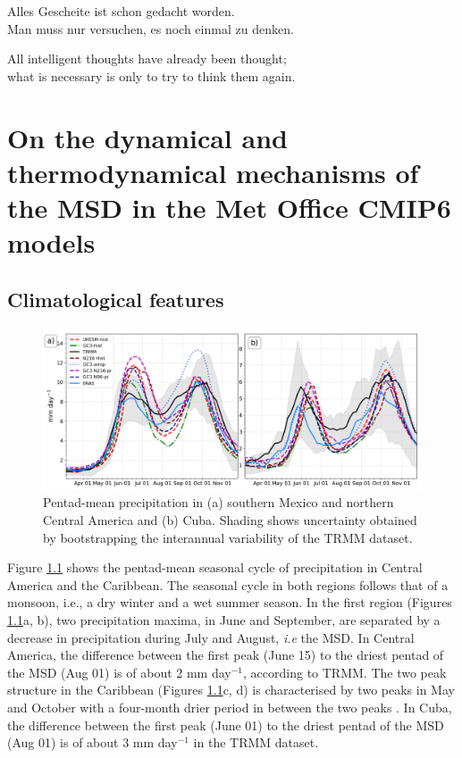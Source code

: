 \begin{savequote}[8cm]
Alles Gescheite ist schon gedacht worden.\\
Man muss nur versuchen, es noch einmal zu denken.

All intelligent thoughts have already been thought;\\
what is necessary is only to try to think them again.
\end{savequote}

\chapter{\label{ch:2-litreview}On the dynamical and thermodynamical mechanisms of the MSD in the Met Office CMIP6 models}

\minitoc


\section{Climatological features}
\label{sq:msdclim}
 \begin{figure}[t!]
\includegraphics[width=\linewidth]{figures/pmean_f2.png}
\caption{Pentad-mean precipitation in (a) southern Mexico and northern Central America and (b) Cuba. Shading shows uncertainty obtained by bootstrapping the interannual variability of the TRMM dataset. }
\label{fig:msdcaribb}
\end{figure}

Figure \ref{fig:msdcaribb} shows the pentad-mean seasonal cycle of precipitation in Central America and the Caribbean. The seasonal cycle in both regions follows that of a monsoon, i.e., a dry winter and a wet summer season. In the first region (Figures \ref{fig:msdcaribb}a, b), two precipitation maxima, in June and September, are separated by a decrease in precipitation during July and August, \textit{i.e} the MSD. In Central America, the difference between the first peak (June 15) to the driest pentad of the MSD (Aug 01) is of about 2 mm day$^{-1}$, according to TRMM. 
 The two peak structure in the Caribbean (Figures \ref{fig:msdcaribb}c, d) is characterised by two peaks in May and October with a four-month drier period in between the two peaks  \citep[e.g.][]{giannini2000,gamble2008,angeles2010origins}. In Cuba, the difference between the first peak (June 01) to the driest pentad of the MSD (Aug 01) is of about 3 mm day$^{-1}$ in the TRMM dataset. 
 
